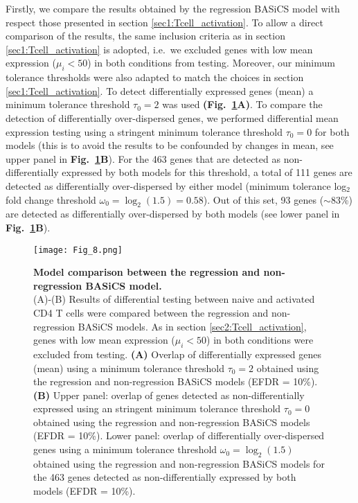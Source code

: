 Firstly, we compare the results obtained by the regression BASiCS model with respect those presented in section \ref{sec1:Tcell_activation}.  
To allow a direct comparison of the results, the same inclusion criteria as in section \ref{sec1:Tcell_activation} is adopted, i.e.~we excluded genes with low mean expression ($\mu_i<50$) in both conditions from testing. Moreover, our  minimum tolerance thresholds were also adapted to match the choices in section \ref{sec1:Tcell_activation}. To detect differentially expressed genes (mean) a minimum tolerance threshold $\tau_0 = 2$ was used \textbf{(Fig.~\ref{fig2:model_comparison}A)}. To compare the detection of differentially over-dispersed genes, we performed differential mean expression testing using a stringent minimum tolerance threshold $\tau_0 = 0$ for both models (this is to avoid the results to be confounded by changes in mean, see upper panel in \textbf{Fig.~\ref{fig2:model_comparison}B}). For the 463 genes that are detected as non-differentially expressed by both models for this threshold, a total of 111 genes are detected as differentially over-dispersed by either model (minimum tolerance log$_2$ fold change threshold $\omega_0 = \log_2(1.5) = 0.58$). Out of this set, 93 genes ($\sim$83\%) are detected as differentially over-dispersed by both models (see lower panel in \textbf{Fig.~\ref{fig2:model_comparison}B}). \\

\begin{figure}[!h]
\centering
\texttt{[image: Fig\_8.png]}
\caption[Model comparison between the regression and non-regression BASiCS model]{\textbf{Model comparison between the regression and non-regression BASiCS model.}\\
(A)-(B) Results of differential testing between naive and activated CD4\plus{} T cells were compared between the regression and non-regression BASiCS models. As in section \ref{sec2:Tcell_activation}, genes with low mean expression ($\mu_i<50$) in both conditions were excluded from testing. \textbf{(A)} Overlap of differentially expressed genes (mean) using a minimum tolerance threshold $
\tau_0=2$ obtained using the regression and non-regression BASiCS models (EFDR = 10\%).\textbf{(B)} Upper panel: overlap of genes detected as non-differentially expressed using an stringent minimum tolerance threshold $\tau_0=0$ obtained using the regression and non-regression BASiCS models (EFDR = 10\%). Lower panel: overlap of differentially over-dispersed genes using a minimum tolerance threshold $\omega_0=\log_2(1.5)$ obtained using the regression and non-regression  BASiCS models for the 463 genes detected as non-differentially expressed by both models (EFDR = 10\%).\\}
\label{fig2:model_comparison}
\end{figure}


